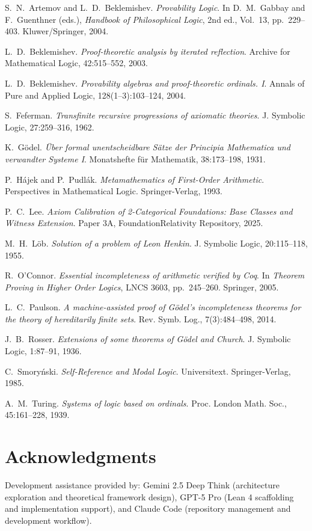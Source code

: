 \documentclass[11pt]{article}
\begin{document}
\begin{thebibliography}{10}

S.~N.~Artemov and L.~D.~Beklemishev.
\emph{Provability Logic}.
In D.~M.~Gabbay and F.~Guenthner (eds.), \emph{Handbook of Philosophical Logic}, 2nd ed., Vol.~13, pp.~229--403.
Kluwer/Springer, 2004.

L.~D.~Beklemishev.
\emph{Proof-theoretic analysis by iterated reflection}.
Archive for Mathematical Logic, 42:515--552, 2003.

L.~D.~Beklemishev.
\emph{Provability algebras and proof-theoretic ordinals. I}.
Annals of Pure and Applied Logic, 128(1--3):103--124, 2004.

S.~Feferman.
\emph{Transfinite recursive progressions of axiomatic theories}.
J. Symbolic Logic, 27:259--316, 1962.

K.~Gödel.
\emph{Über formal unentscheidbare Sätze der Principia Mathematica und verwandter Systeme I}.
Monatshefte für Mathematik, 38:173--198, 1931.

P.~Hájek and P.~Pudlák.
\emph{Metamathematics of First-Order Arithmetic}.
Perspectives in Mathematical Logic. Springer-Verlag, 1993.

P.~C.~Lee.
\emph{Axiom Calibration of 2-Categorical Foundations: Base Classes and Witness Extension}.
Paper 3A, FoundationRelativity Repository, 2025.

M.~H.~Löb.
\emph{Solution of a problem of Leon Henkin}.
J. Symbolic Logic, 20:115--118, 1955.

R.~O'Connor.
\emph{Essential incompleteness of arithmetic verified by Coq}.
In \emph{Theorem Proving in Higher Order Logics}, LNCS 3603, pp.~245--260. Springer, 2005.

L.~C.~Paulson.
\emph{A machine-assisted proof of Gödel's incompleteness theorems for the theory of hereditarily finite sets}.
Rev. Symb. Log., 7(3):484--498, 2014.

J.~B.~Rosser.
\emph{Extensions of some theorems of Gödel and Church}.
J. Symbolic Logic, 1:87--91, 1936.

C.~Smoryński.
\emph{Self-Reference and Modal Logic}.
Universitext. Springer-Verlag, 1985.

A.~M.~Turing.
\emph{Systems of logic based on ordinals}.
Proc. London Math. Soc., 45:161--228, 1939.

\end{thebibliography}

\section*{Acknowledgments}
Development assistance provided by: Gemini 2.5 Deep Think (architecture exploration and theoretical framework design), GPT-5 Pro (Lean 4 scaffolding and implementation support), and Claude Code (repository management and development workflow).
\end{document}
